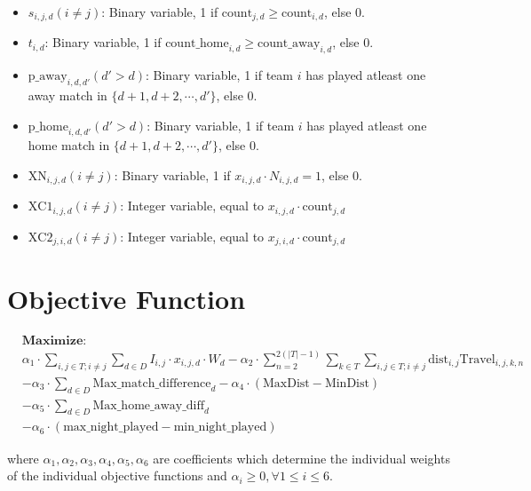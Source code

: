 \documentclass[a4paper, 12pt]{article}
\begin{document}
\begin{itemize}
    \item $s_{i,j,d} (i \neq j)$: Binary variable, 1 if $\text{count}_{j,d} \geq \text{count}_{i,d}$, else 0.
    \item $t_{i,d}$: Binary variable, 1 if $\text{count\_home}_{i,d} \geq \text{count\_away}_{i,d}$, else 0.
    \item $\text{p\_away}_{i,d,d'} (d' > d)$: Binary variable, 1 if team $i$ has played atleast one away match in $\{d+1,d+2,\cdots,d'\}$, else 0.
    \item $\text{p\_home}_{i,d,d'} (d' > d)$: Binary variable, 1 if team $i$ has played atleast one home match in $\{d+1,d+2,\cdots,d'\}$, else 0.
    \item $\text{XN}_{i,j,d} (i \neq j)$: Binary variable, 1 if $x_{i,j,d} \cdot N_{i,j,d} = 1$, else 0.
    \item $\text{XC1}_{i,j,d} (i \neq j)$: Integer variable, equal to $x_{i,j,d} \cdot \text{count}_{j,d}$
    \item $\text{XC2}_{j,i,d} (i \neq j)$: Integer variable, equal to $x_{j,i,d} \cdot \text{count}_{j,d}$
\end{itemize}

\section*{Objective Function}
\begin{align*}
&\textbf{Maximize: }\\ 
&\alpha_1 \cdot \sum_{i,j \in T; i \neq j} \sum_{d \in D} I_{i,j} \cdot x_{i,j,d} \cdot W_{d} - \alpha_2 \cdot \sum_{n = 2}^{2(|T| - 1)} \sum_{k \in T} \sum_{i,j \in T; i \neq j}  \text{dist}_{i,j}\text{Travel}_{i,j,k,n}  \\ 
&- \alpha_3 \cdot \sum_{d \in D} \text{Max\_match\_difference}_{d} - \alpha_4 \cdot (\text{MaxDist} - \text{MinDist})\\
&- \alpha_5 \cdot \sum_{d \in D} \text{Max\_home\_away\_diff}_{d} \\
&- \alpha_6 \cdot (\text{max\_night\_played} - \text{min\_night\_played})
\end{align*}

where $\alpha_1, \alpha_2, \alpha_3, \alpha_4, \alpha_5, \alpha_6$ are coefficients which determine the individual weights of the individual objective functions and $\alpha_i \geq 0, \forall 1 \leq i \leq 6$.
\end{document}
